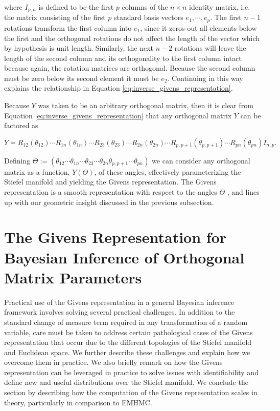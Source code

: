\documentclass[ba]{imsart}
\numberwithin{equation}{section}
\theoremstyle{plain}
\begin{document}
\noindent where $I_{p,n}$ is defined to be the first $p$ columns of the $n \times n$ identity matrix, i.e. the matrix consisting of the first $p$ standard basis vectors $e_1, \cdots, e_p$. The first $n-1$ rotations transform the first column into $e_1$, since it zeros out all elements below the first and the orthogonal rotations do not affect the length of the vector which by hypothesis is unit length. Similarly, the next $n-2$ rotations will leave the length of the second column and its orthogonality to the first column intact because again, the rotation matrices are orthogonal. Because the second column must be zero below its second element it must be $e_2$. Continuing in this way explains the relationship in Equation \ref{eq:inverse_givens_representation}.

\noindent Because $Y$ was taken to be an arbitrary orthogonal matrix, then it is clear from Equation \ref{eq:inverse_givens_representation} that any orthogonal matrix $Y$ can be factored as

\begin{equation}
\label{eq:givens_representation}
Y = R_{12}(\theta_{12}) \cdots R_{1n}(\theta_{1n})  \cdots R_{23}(\theta_{23}) \cdots R_{2n}(\theta_{2n}) \cdots R_{p,p+1}(\theta_{p,p+1}) \cdots R_{pn}(\theta_{pn}) I_{n,p}.
\end{equation}

\noindent Defining $\Theta := (\theta_{12} \cdots \theta_{1n} \cdots \theta_{23} \cdots \theta_{2n} \theta_{p,p+1} \cdots \theta_{pn})$ we can consider any orthogonal matrix as a function, $Y(\Theta)$, of these angles, effectively parameterizing the Stiefel manifold and yielding the Givens representation. The Givens representation is a smooth representation with respect to the angles $\Theta$ \citep{shepard2015representation},  and lines up with our geometric insight discussed in the previous subsection.


\section{The Givens Representation for Bayesian Inference of Orthogonal Matrix Parameters} \label{implementation}

Practical use of the Givens representation in a general Bayesian inference framework involves solving several practical challenges. In addition to the standard change of measure term required in any transformation of a random variable, care must be taken to address certain pathological cases of the Givens representation that occur due to the different topologies of the Stiefel manifold and Euclidean space. We further describe these challenges and explain how we overcome them in practice. We also briefly remark on how the Givens representation can be leveraged in practice to solve issues with identifiability and define new and useful distributions over the Stiefel manifold. We conclude the section by describing how the computation of the Givens representation scales in theory, particularly in comparison to EMHMC.
\end{document}
